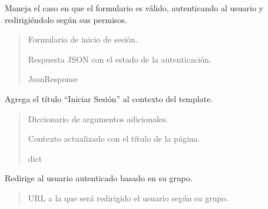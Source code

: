 \documentclass[letterpaper,10pt,spanish]{sphinxmanual}
\begin{document}
\begin{fulllineitems}
\begin{fulllineitems}

\pysigstartsignatures
{}
\pysigstopsignatures
\sphinxAtStartPar
Maneja el caso en que el formulario es válido, autenticando al usuario y redirigiéndolo según sus permisos.
\begin{quote}\begin{description}
\sphinxAtStartPar
{} \textendash{} Formulario de inicio de sesión.

\sphinxAtStartPar
Respuesta JSON con el estado de la autenticación.

\sphinxAtStartPar
JsonResponse

\end{description}\end{quote}

\end{fulllineitems}



\begin{fulllineitems}

\pysigstartsignatures
{}
\pysigstopsignatures
\sphinxAtStartPar
Agrega el título “Iniciar Sesión” al contexto del template.
\begin{quote}\begin{description}
\sphinxAtStartPar
{} \textendash{} Diccionario de argumentos adicionales.

\sphinxAtStartPar
Contexto actualizado con el título de la página.

\sphinxAtStartPar
dict

\end{description}\end{quote}

\end{fulllineitems}



\begin{fulllineitems}

\pysigstartsignatures
{}
\pysigstopsignatures
\sphinxAtStartPar
Redirige al usuario autenticado basado en su grupo.
\begin{quote}\begin{description}
\sphinxAtStartPar
URL a la que será redirigido el usuario según su grupo.


\end{description}
\end{quote}
\end{fulllineitems}
\end{fulllineitems}
\end{document}

